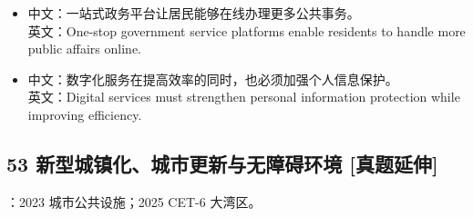 \documentclass[a4paper,11pt,UTF8,fontset=none]{ctexart}
\begin{document}
\begin{itemize}[leftmargin=1.7em,itemsep=1pt,parsep=0pt,topsep=2pt]
\item \noindent 中文：一站式政务平台让居民能够在线办理更多公共事务。\\ 英文：One-stop government service platforms enable residents to handle more public affairs online.\par


\item \noindent 中文：数字化服务在提高效率的同时，也必须加强个人信息保护。\\ 英文：Digital services must strengthen personal information protection while improving efficiency.\par


\end{itemize}

\subsection{53 新型城镇化、城市更新与无障碍环境 {\color{AccentBlue} [真题延伸]}}

\begin{tcolorbox}[enhanced,breakable,boxrule=0.35pt,colback=VeryPaleBlue,colframe=AccentBlue!40,left=7pt,right=7pt,top=4pt,bottom=4pt,borderline west={2pt}{0pt}{AccentBlue},before skip=4pt,after skip=6pt]
：2023 城市公共设施；2025 CET-6 大湾区。\par


\end{tcolorbox}
\end{document}
